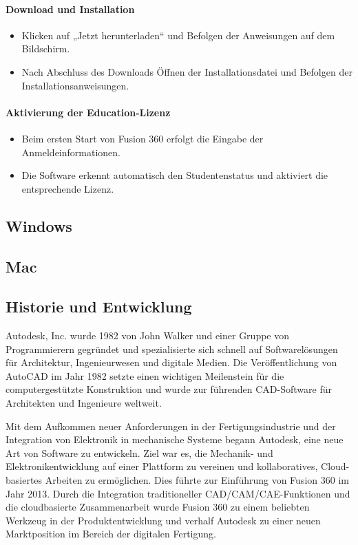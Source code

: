 \paragraph{ Download und Installation}
\begin{itemize}
	\item Klicken auf „Jetzt herunterladen“ und Befolgen der Anweisungen auf dem Bildschirm.
	\item Nach Abschluss des Downloads Öffnen der Installationsdatei und Befolgen der Installationsanweisungen.
\end{itemize}

\paragraph*{Aktivierung der Education-Lizenz}
\begin{itemize}
	\item Beim ersten Start von Fusion 360 erfolgt die Eingabe der Anmeldeinformationen.
	\item Die Software erkennt automatisch den Studentenstatus und aktiviert die entsprechende Lizenz.
\end{itemize}




\subsection*{Windows}
\subsection*{Mac}
\subsection{Historie und Entwicklung}
Autodesk, Inc. wurde 1982 von John Walker und einer Gruppe von Programmierern gegründet und spezialisierte sich schnell auf Softwarelösungen für Architektur, Ingenieurwesen und digitale Medien. \autocite{wikipedia_autodesk}
Die Veröffentlichung von AutoCAD im Jahr 1982 setzte einen wichtigen Meilenstein für die computergestützte Konstruktion und wurde zur führenden CAD-Software für Architekten und Ingenieure weltweit.\autocite{wikipedia_autocad_version_history}


Mit dem Aufkommen neuer Anforderungen in der Fertigungsindustrie und der Integration von Elektronik in mechanische Systeme begann Autodesk, eine neue Art von Software zu entwickeln. Ziel war es, die Mechanik- und Elektronikentwicklung auf einer Plattform zu vereinen und kollaboratives, Cloud-basiertes Arbeiten zu ermöglichen. Dies führte zur Einführung von Fusion 360 im Jahr 2013. \autocite{wikipedia_autodesk_deutsch}
Durch die Integration traditioneller CAD/CAM/CAE-Funktionen und die cloudbasierte Zusammenarbeit wurde Fusion 360 zu einem beliebten Werkzeug in der Produktentwicklung und verhalf Autodesk zu einer neuen Marktposition im Bereich der digitalen Fertigung.
